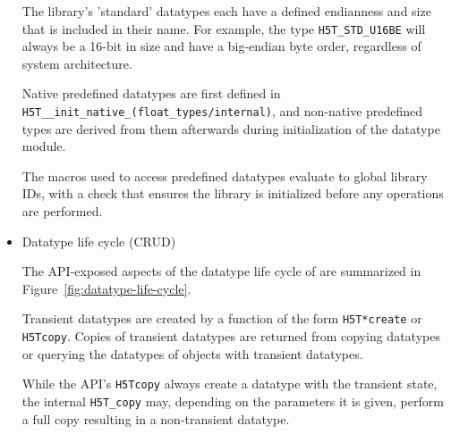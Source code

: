 \begin{itemize}
The library's 'standard' datatypes each have a defined endianness and size that is included in their name. For example, the type \texttt{H5T\_STD\_U16BE} will always be a 16-bit in size and have a big-endian byte order, regardless of system architecture. 

Native predefined datatypes are first defined in \texttt{H5T\_\_init\_native\_(float\_types/internal)}, and non-native predefined types are derived from them afterwards during initialization of the datatype module.

The macros used to access predefined datatypes evaluate to global library IDs, with a check that ensures the library is initialized before any operations are performed.

    
        
    \item Datatype life cycle (CRUD)

The API-exposed aspects of the datatype life cycle of are summarized in Figure~\ref{fig:datatype-life-cycle}.

Transient datatypes are created by a function of the form \texttt{H5T*create} or \texttt{H5Tcopy}. Copies of transient datatypes are returned from copying datatypes or querying the datatypes of objects with transient datatypes.

While the API's \texttt{H5Tcopy} always create a datatype with the transient state, the internal \texttt{H5T\_copy} may, depending on the parameters it is given, perform a full copy resulting in a non-transient datatype.


\end{itemize}

